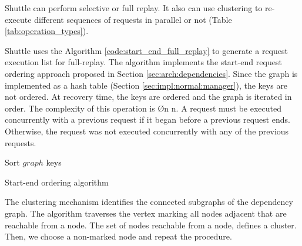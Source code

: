 Shuttle can perform selective or full replay. It also can use clustering to re-execute different sequences of requests in parallel or not (Table \ref{tab:operation_types}).

Shuttle uses the Algorithm \ref{code:start_end_full_replay} to generate a request execution list for full-replay. The algorithm implements the start-end request ordering approach proposed in Section \ref{sec:arch:dependencies}. Since the graph is implemented as a hash table (Section \ref{sec:impl:normal:manager}), the keys are not ordered. At recovery time, the keys are ordered and the graph is iterated in order. The complexity of this operation is \O{n \log{} n}. A request must be executed concurrently with a previous request if it began before a previous request ends. Otherwise, the request was not executed concurrently with any of the previous requests.

\begin{algorithm}[H]
\DontPrintSemicolon{}
	  \BlankLine
	  Sort $graph$ keys\;
	  \BlankLine
	\caption{Start-end ordering algorithm}
	\label{code:start_end_full_replay}
\end{algorithm}


The clustering mechanism identifies the connected subgraphs of the dependency graph. The algorithm traverses the vertex marking all nodes adjacent that are reachable from a node. The set of nodes reachable from a node, defines a cluster. Then, we choose a non-marked node and repeat the procedure.\\

